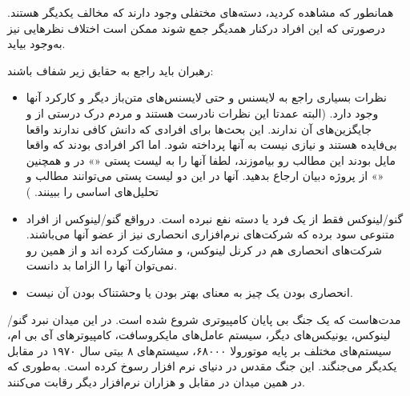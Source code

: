 همانطور که مشاهده کردید، دسته‌های مختفلی وجود دارند که مخالف یکدیگر هستند.
درصورتی که این افراد درکنار همدیگر جمع شوند ممکن است اختلاف نظرهایی نیز به‌وجود بیاید.

رهبران باید راجع به حقایق زیر شفاف باشند:

\begin{itemize}
\item 
نظرات بسیاری راجع به لایسنس  و حتی لایسنس‌های متن‌باز دیگر و کارکرد آنها وجود دارد.
(البته عمدتا این نظرات نادرست هستند و مردم درک درستی از  و جایگزین‌های آن ندارند.
این بحث‌ها برای افرادی که دانش کافی ندارند واقعا بی‌فایده هستند و نیازی نیست به آنها پرداخته شود.
اما اکر افرادی بودند که واقعا مایل بودند این مطالب رو بیاموزند، لطفا آنها را به لیست پستی «» 
در  و همچنین «» از پروژه دبیان ارجاع بدهید. آنها در این دو لیست پستی
می‌توانند مطالب و تحلیل‌های اساسی را ببینند.
)

\item 
گنو/لینوکس فقط از یک فرد یا دسته نفع نبرده است. درواقع گنو/لینوکس از افراد متنوعی
سود برده که شرکت‌های نرم‌افزاری انحصاری نیز از عضو آنها می‌باشند. شرکت‌های انحصاری
هم در کرنل لینوکس،  و  مشارکت کرده اند و از همین رو نمی‌توان آنها
را الزاما بد دانست.

\item 
انحصاری بودن یک چیز به معنای بهتر بودن یا وحشتناک بودن آن نیست.
\end{itemize}

مدت‌هاست که یک جنگ بی پایان کامپیوتری شروع شده است. در این میدان نبرد
گنو/لینوکس، یونیکس‌های دیگر، سیستم عامل‌های مایکروسافت، کامپیوترهای آی بی ام،
سیستم‌های مختلف بر پایه موتورولا ۶۸۰۰۰، سیستم‌های ۸ بیتی سال ۱۹۷۰ در مقابل یکدیگر
می‌جنگند. این جنگ مقدس در دنیای نرم افزار رسوخ کرده است. به‌طوری که در
همین میدان  در مقابل  و هزاران نرم‌افزار دیگر رقابت می‌کنند.

